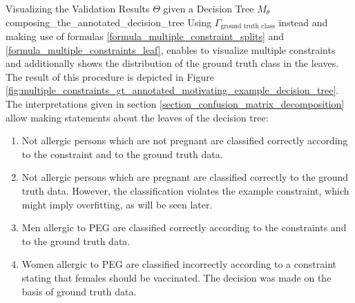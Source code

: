 \begin{Bsp}{Visualizing the Validation Results $\Theta$ given a Decision Tree $M_\theta$}{composing_the_annotated_decision_tree}
    Using $\Gamma_\text{ground truth class}$ instead and making use of formulas \ref{formula_multiple_constraint_splits} and \ref{formula_multiple_constraints_leaf}, enables to visualize multiple constraints and additionally shows the distribution of the ground truth class in the leaves. The result of this procedure is depicted in Figure \ref{fig:multiple_constraints_gt_annotated_motivating_example_decision_tree}. The interpretations given in section \ref{section_confusion_matrix_decomposition} allow making statements about the leaves of the decision tree:
    \begin{enumerate}
        \item Not allergic persons which are not pregnant are classified correctly according to the constraint and to the ground truth data.
        \item Not allergic persons which are pregnant are classified correctly to the ground truth data. However, the classification violates the example constraint, which might imply overfitting, as will be seen later.
        \item Men allergic to PEG are classified correctly according to the constraints and to the ground truth data.
        \item Women allergic to PEG are classified incorrectly according to a constraint stating that females should be vaccinated. The decision was made on the basis of ground truth data.
    \end{enumerate}


\end{Bsp}
